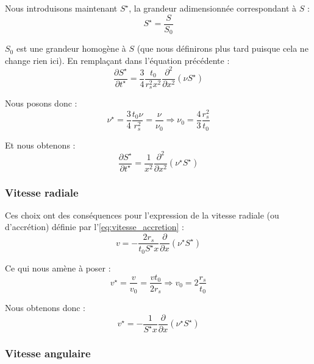 Nous introduisons maintenant $S^\star$, la grandeur adimensionnée correspondant
à $S$ :
\begin{equation}
    S^\star = \frac{S}{S_0}
\end{equation}

$S_0$ est une grandeur homogène à $S$ (que nous définirons plus tard puisque
cela ne change rien ici). En remplaçant dans l’équation précédente :
\begin{equation}
    \frac{\partial S^\star}{\partial t^\star} = \frac{3}{4} \frac{t_0}{r_s^2 x^2} \frac{\partial^2}{\partial x^2} \left(\nu S^\star\right)
\end{equation}

Nous posons donc :
\begin{equation}
    \label{eq:viscosite_adim}
    \nu^\star = \frac{3}{4} \frac{t_0 \nu}{r_s^2} = \frac{\nu}{\nu_0} \Rightarrow \nu_0 = \frac{4}{3} \frac{r_s^2}{t_0}
\end{equation}

Et nous obtenons :
\begin{equation}
    \label{eq:rel_densite_surface_adim}
    \frac{\partial S^\star}{\partial t^\star} = \frac{1}{x^2} \frac{\partial^2}{\partial x^2} \left(\nu^\star S^\star\right)
\end{equation}

\subsubsection{Vitesse radiale}

Ces choix ont des conséquences pour l’expression de la vitesse radiale (ou
d’accrétion) définie par l’\cref{eq:vitesse_accretion} :
\begin{equation}
    v = - \frac{2 r_s}{t_0 S^\star x} \frac{\partial}{\partial x} \left(\nu^\star S^\star\right)
\end{equation}

Ce qui nous amène à poser :
\begin{equation}
    v^\star = \frac{v}{v_0} = \frac{v t_0}{2 r_s} \Rightarrow v_0 = 2 \frac{r_s}{t_0}
\end{equation}

Nous obtenons donc :
\begin{equation}
    v^\star = - \frac{1}{S^\star x} \frac{\partial}{\partial x} \left(\nu^\star S^\star\right)
\end{equation}

\subsubsection{Vitesse angulaire}

